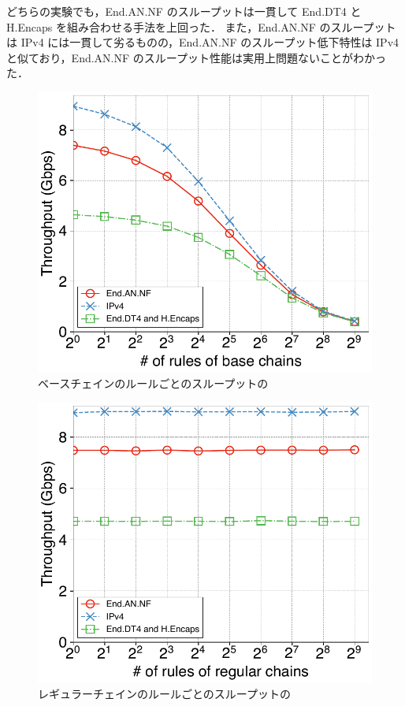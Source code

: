 どちらの実験でも，End.AN.NF のスループットは一貫して End.DT4 と H.Encaps を組み合わせる手法を上回った．
また，End.AN.NF のスループットは IPv4 には一貫して劣るものの，End.AN.NF のスループット低下特性は IPv4 と似ており，End.AN.NF のスループット性能は実用上問題ないことがわかった．

\begin{figure}[t]
  \centering
  \includegraphics[width=0.95\linewidth]{img/rule-throughput.pdf}
  \caption{ベースチェインのルールごとのスループットの}
  \label{fig:rule-thru}
\end{figure}

\begin{figure}[t]
  \centering
  \includegraphics[width=0.95\linewidth]{img/regular-throughput.pdf}
  \caption{レギュラーチェインのルールごとのスループットの}
  \label{fig:reg-thru}
\end{figure}

